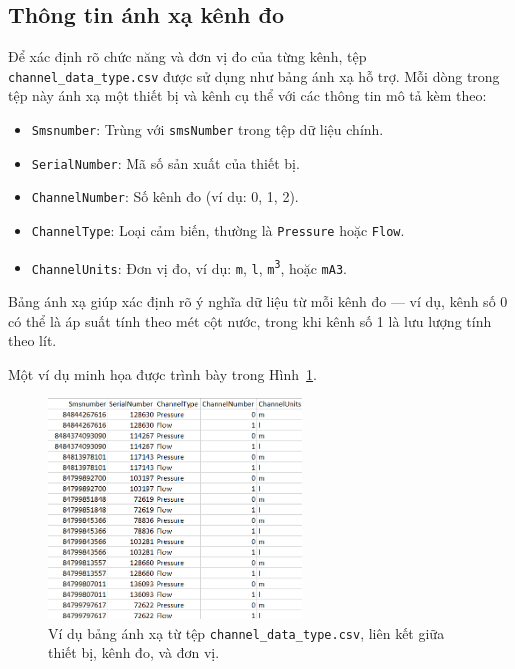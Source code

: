 \subsection{Thông tin ánh xạ kênh đo}

Để xác định rõ chức năng và đơn vị đo của từng kênh, tệp \texttt{channel\_data\_type.csv} được sử dụng như bảng ánh xạ hỗ trợ. Mỗi dòng trong tệp này ánh xạ một thiết bị và kênh cụ thể với các thông tin mô tả kèm theo:

\begin{itemize}
    \item \texttt{Smsnumber}: Trùng với \texttt{smsNumber} trong tệp dữ liệu chính.
    \item \texttt{SerialNumber}: Mã số sản xuất của thiết bị.
    \item \texttt{ChannelNumber}: Số kênh đo (ví dụ: 0, 1, 2).
    \item \texttt{ChannelType}: Loại cảm biến, thường là \texttt{Pressure} hoặc \texttt{Flow}.
    \item \texttt{ChannelUnits}: Đơn vị đo, ví dụ: \texttt{m}, \texttt{l}, \texttt{m\textsuperscript{3}}, hoặc \texttt{mA3}.
\end{itemize}

\noindent
Bảng ánh xạ giúp xác định rõ ý nghĩa dữ liệu từ mỗi kênh đo — ví dụ, kênh số 0 có thể là áp suất tính theo mét cột nước, trong khi kênh số 1 là lưu lượng tính theo lít.

\vspace{0.5em}
Một ví dụ minh họa được trình bày trong Hình~\ref{fig:channel_mapping_table}.

\begin{figure}[htbp]
    \centering
    \includegraphics[width=0.6\textwidth]{image/section6_1/channel_mapping_table.png}
    \caption{Ví dụ bảng ánh xạ từ tệp \texttt{channel\_data\_type.csv}, liên kết giữa thiết bị, kênh đo, và đơn vị.}
    \label{fig:channel_mapping_table}
\end{figure}

